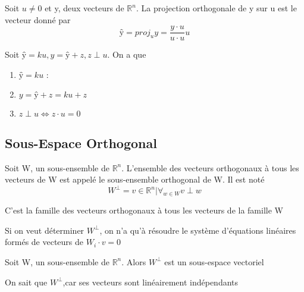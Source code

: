 \documentclass{article}
\begin{document}
\begin{proposition}
    Soit $ u \neq 0$ et y, deux vecteurs de $\mathbb{R}^n$. La projection
    orthogonale de y sur u est le vecteur donné par
    $$ ŷ = proj_u y = \frac{y \cdot u}{u \cdot u} u $$
\end{proposition}

\begin{intuition}
    Soit $ŷ=ku, y=ŷ+z, z \perp u$. On a que
    \begin{enumerate}
	\item $ŷ=ku$ :
	\item $y=ŷ+z = ku +z$
	\item $ z \perp u \Longleftrightarrow z \cdot u=0$
    \end{enumerate}
\end{intuition}

\subsection{Sous-Espace Orthogonal}

\begin{definition}
    Soit W, un sous-ensemble de $\mathbb{R}^n$. L'ensemble des vecteurs
    orthogonaux à tous les vecteurs de W est appelé le sous-ensemble
    orthogonal de W. Il est noté
    $$ W^\perp = {v \in \mathbb{R}^n | \forall _{w \in W} v \perp w } $$
\end{definition}

\begin{intuition}
    C'est la famille des vecteurs orthogonaux à tous les vecteurs de la
    famille W
\end{intuition}

\begin{problem}
    Si on veut déterminer $W^\perp$, on n'a qu'à résoudre le système
    d'équations linéaires formés de vecteurs de $W_i \cdot v = 0$
\end{problem}

\begin{definition}
    Soit W, un sous-ensemble de $\mathbb{R}^n$. Alors $W^\perp$ est un
    sous-espace vectoriel
\end{definition}

\begin{intuition}
    On sait que $W^\perp$,car ses vecteurs sont linéairement indépendants
\end{intuition}
\end{document}
